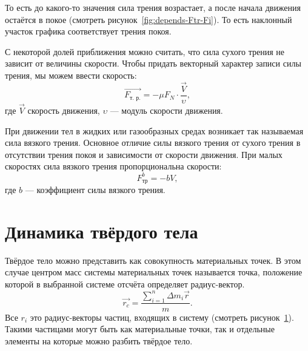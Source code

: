 То есть до какого-то значения сила трения возрастает, а после начала движения
остаётся в покое (смотреть рисунок~\ref{fig:depends-Ftr-Fi}). То есть наклонный
участок графика соответствует трения покоя.

С некоторой долей приближения можно считать, что сила сухого трения не зависит
от величины скорости. Чтобы придать векторный характер записи силы трения, мы
можем ввести скорость: \[
  \vec{F_\text{т. р.}} = - \mu F_N \cdot \frac{\vec{V}}{\upsilon}
,\] где \( \vec{V} \) скорость движения, \( \upsilon \) --- модуль скорости
движения.

При движении тел в жидких или газообразных средах возникает так называемая сила
вязкого трения. Основное отличие силы вязкого трения от сухого трения в
отсутствии трения покоя и зависимости от скорости движения. При малых скоростях
сила вязкого трения пропорциональна скорости: \[
  F_\text{тр}^b = -b V
,\] где \( b \) --- коэффициент силы вязкого трения.

\section{Динамика твёрдого тела}%

\begin{figure}[!htbp]
  \begin{center}
  \end{center}
  \caption{}%
  \label{fig:pull-radius-vectors}
\end{figure}

Твёрдое тело можно представить как совокупность материальных точек. В этом
случае центром масс системы материальных точек называется точка, положение
которой в выбранной системе отсчёта определяет радиус-вектор. \[
  \vec{r_c} = \frac{\sum_{i=1}^{n} \Delta m_i \vec{r}}{m}
.\] Все \( r_i \) это радиус-векторы частиц, входящих в систему (смотреть
рисунок~\ref{fig:pull-radius-vectors}). Такими частицами могут быть как
материальные точки, так и отдельные элементы на которые можно разбить твёрдое
тело.

